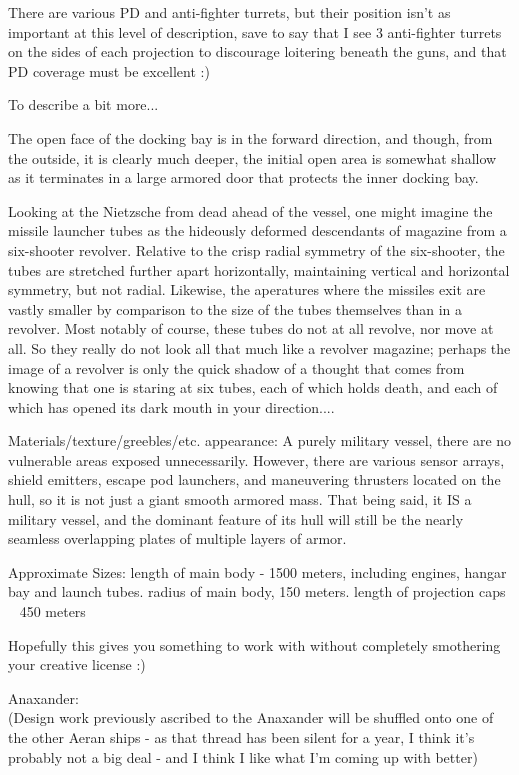 There are various PD and anti-fighter turrets, but their position
isn't as important at this level of description, save to say that I
see 3 anti-fighter turrets on the sides of each projection to
discourage loitering beneath the guns, and that PD coverage must be
excellent :)

To describe a bit more...

The open face of the docking bay is in the forward direction, and
though, from the outside, it is clearly much deeper, the initial open
area is somewhat shallow as it terminates in a large armored door that
protects the inner docking bay.

Looking at the Nietzsche from dead ahead of the vessel, one might
imagine the missile launcher tubes as the hideously deformed
descendants of magazine from a six-shooter revolver. Relative to the
crisp radial symmetry of the six-shooter, the tubes are stretched
further apart horizontally, maintaining vertical and horizontal
symmetry, but not radial. Likewise, the aperatures where the missiles
exit are vastly smaller by comparison to the size of the tubes
themselves than in a revolver. Most notably of course, these tubes do
not at all revolve, nor move at all. So they really do not look all
that much like a revolver magazine; perhaps the image of a revolver is
only the quick shadow of a thought that comes from knowing that one is
staring at six tubes, each of which holds death, and each of which has
opened its dark mouth in your direction....


Materials/texture/greebles/etc. appearance: A purely military vessel,
there are no vulnerable areas exposed unnecessarily.  However, there
are various sensor arrays, shield emitters, escape pod launchers, and
maneuvering thrusters located on the hull, so it is not just a giant
smooth armored mass. That being said, it IS a military vessel, and the
dominant feature of its hull will still be the nearly seamless
overlapping plates of multiple layers of armor.

Approximate Sizes: length of main body - 1500 meters, including
engines, hangar bay and launch tubes.  radius of main body, 150
meters.  length of projection caps ~ 450 meters

Hopefully this gives you something to work with without completely
smothering your creative license :)

Anaxander:\\ 

(Design work previously ascribed to the Anaxander will be shuffled
onto one of the other Aeran ships - as that thread has been silent for
a year, I think it's probably not a big deal - and I think I like what
I'm coming up with better)

